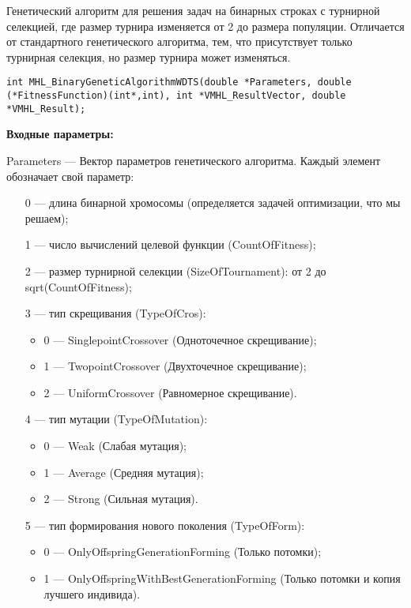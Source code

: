 \documentclass[a4paper,12pt]{article}
\begin{document}
Генетический алгоритм для решения задач на бинарных строках с турнирной селекцией, где размер турнира изменяется от 2 до размера популяции. Отличается от стандартного генетического алгоритма, тем, что присутствует только турнирная селекция, но размер турнира может изменяться.


\begin{lstlisting}[label=code_syntax_MHL_BinaryGeneticAlgorithmWDTS,caption=Синтаксис]
int MHL_BinaryGeneticAlgorithmWDTS(double *Parameters, double (*FitnessFunction)(int*,int), int *VMHL_ResultVector, double *VMHL_Result);
\end{lstlisting}

\textbf{Входные параметры:}
 
Parameters --- Вектор параметров генетического алгоритма. Каждый элемент обозначает свой параметр:
 
 \begin{itemize}
 \item [0] --- длина бинарной хромосомы (определяется задачей оптимизации, что мы решаем);
 
 \item [1] --- число вычислений целевой функции (CountOfFitness);
 
 \item [2] --- размер турнирной селекции (SizeOfTournament): от 2 до sqrt(CountOfFitness);
 
 \item [3] --- тип скрещивания (TypeOfCros):
  \begin{itemize}
       \item 0 --- SinglepointCrossover (Одноточечное скрещивание);
 
       \item 1 --- TwopointCrossover (Двухточечное скрещивание);
 
       \item 2 --- UniformCrossover (Равномерное скрещивание).
	    \end{itemize}
 
 \item [4] --- тип мутации (TypeOfMutation):
  \begin{itemize}
       \item 0 --- Weak (Слабая мутация);
 
       \item 1 --- Average (Средняя мутация);
 
       \item 2 --- Strong (Сильная мутация).
	    \end{itemize}
 
 \item [5] --- тип формирования нового поколения (TypeOfForm):
  \begin{itemize}
       \item 0 --- OnlyOffspringGenerationForming (Только потомки);
 
       \item 1 --- OnlyOffspringWithBestGenerationForming (Только потомки и копия лучшего индивида).
	    \end{itemize}
		
 \end{itemize}
 
\end{document}
